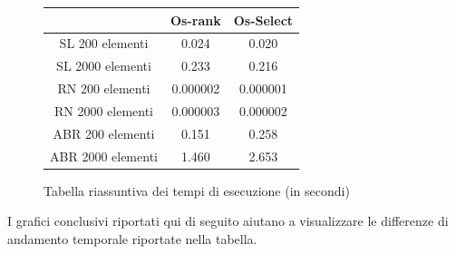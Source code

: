     \begin{figure}[h]
    \centering
    \begin{tabular}{|c|c|c|}
        \hline
         & Os-rank & Os-Select\\
        \hline
        SL 200 elementi & 0.024 & 0.020\\
        \hline
        SL 2000 elementi & 0.233 & 0.216\\
        \hline
        RN 200 elementi & 0.000002 & 0.000001\\
        \hline
        RN 2000 elementi & 0.000003 & 0.000002\\
        \hline
        ABR 200 elementi & 0.151 & 0.258\\
        \hline
        ABR 2000 elementi & 1.460 & 2.653\\
        \hline
    \end{tabular}
    \caption{Tabella riassuntiva dei tempi di esecuzione (in secondi)}
    \end{figure}

    \vspace{1cm}

    I grafici conclusivi riportati qui di seguito aiutano a visualizzare le differenze di andamento temporale riportate nella tabella.


